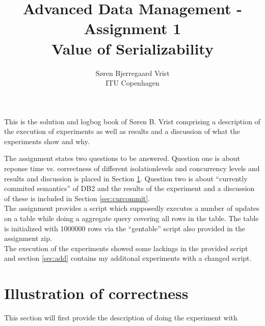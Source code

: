
\title{Advanced Data Management - Assignment 1\\Value of Serializability}
\author{S\o ren Bjerregaard Vrist\\ITU Copenhagen}


\maketitle

This is the solution and logbog book of S\o ren B. Vrist comprising a description of the execution
of experiments as well as results and a discussion of what the experiments show
and why.

The assignment states two questions to be answered. Question one is about
reponse time vs. correctness of different isolationlevels and concurrency
levels and results and discussion is placed in Section \ref{sec:illcorr}.
Question two is about ``currently commited semantics'' of DB2 and the results of
the experiment and a discussion of these is included in Section
\ref{sec:curcommit}.\\

The assignment provides a script which supposedly executes a number of updates
on a table while doing a aggregate query covering all rows in the table. 
The table is initialized with 1000000 rows via the ``gentable'' script also
provided in the assignment zip.\\

The execution of the experiments showed some lackings in the provided script and
section \ref{sec:add} contains my additonal experiments with a changed script.

\chapter{Illustration of correctness}\label{sec:illcorr}
This section will first provide the description of doing the experiment with 

